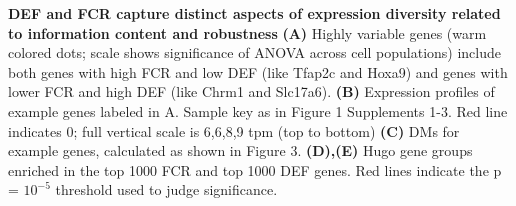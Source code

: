\textbf{DEF and FCR capture distinct aspects of expression diversity related to information content and robustness} \textbf{(A)} Highly variable genes (warm colored dots; scale shows significance of ANOVA across cell populations) include both genes with high FCR and low DEF (like Tfap2c and Hoxa9) and genes with lower FCR and high DEF (like Chrm1 and Slc17a6). \textbf{(B)} Expression profiles of example genes labeled in A. Sample key as in Figure 1 Supplements 1-3. Red line indicates 0; full vertical scale is 6,6,8,9 tpm (top to bottom) \textbf{(C)} DMs for example genes, calculated as shown in Figure 3. \textbf{(D),(E)} Hugo gene groups enriched in the top 1000 FCR and top 1000 DEF genes. Red lines indicate the p = $10^{-5}$ threshold used to judge significance.